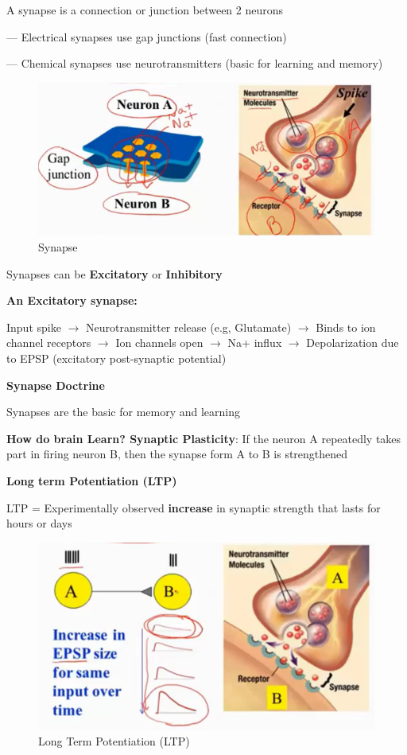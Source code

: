 \documentclass{book}
\begin{document}
A synapse is a connection or junction between 2 neurons

--- Electrical synapses use gap junctions (fast connection)

--- Chemical synapses use neurotransmitters (basic for learning and memory)

\begin{figure}[h]
\centering
\includegraphics[width=0.7\linewidth, height=0.2\textheight]{./figures/synapse}
\caption{Synapse}
\label{fig:synapse}
\end{figure}


Synapses can be \textbf{Excitatory} or \textbf{Inhibitory}

\textbf{An Excitatory synapse:}

Input spike $\rightarrow$ Neurotransmitter release (e.g, Glutamate) $\rightarrow$ Binds to ion channel receptors $\rightarrow$ Ion channels open $\rightarrow$ Na+ influx $\rightarrow$ Depolarization due to EPSP (excitatory post-synaptic potential)

\textbf{Synapse Doctrine}

Synapses are the basic for memory and learning

\textbf{How do brain Learn? Synaptic Plasticity}: If the neuron A repeatedly takes part in firing neuron B, then the synapse form A to B is strengthened

\textbf{Long term Potentiation (LTP)}

LTP = Experimentally observed \textbf{increase} in synaptic strength that lasts for hours or days

\begin{figure}[h]
\centering
\includegraphics[width=0.7\linewidth]{./figures/LTP}
\caption{Long Term Potentiation (LTP)}
\label{fig:LTP}
\end{figure}
\end{document}
